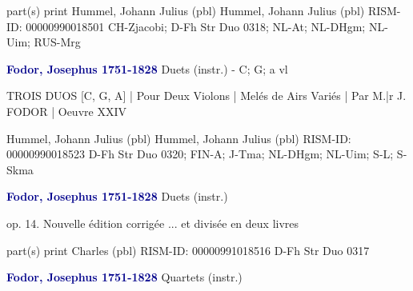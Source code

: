 \documentclass[twocolumn]{book}
\begin{document}
\newline \textcolor{darkblue}{}  part(s)
\newline print
\newline Hummel, Johann Julius  (pbl)
\newline Hummel, Johann Julius  (pbl)
\newline RISM-ID: 00000990018501
\newline CH-Zjacobi; D-Fh  Str Duo 0318; NL-At; NL-DHgm; NL-Uim; RUS-Mrg
\newline \par \vspace{7pt} \textcolor{darkblue}{\textbf{Fodor, Josephus  1751-1828}}
\newline Duets (instr.) - C; G; a
 vl
\newline \begin{itshape}TROIS DUOS [C, G, A] | Pour Deux Violons | Melés de Airs Variés | Par  M.|r J. FODOR | Oeuvre XXIV\end{itshape} 
\newline Hummel, Johann Julius  (pbl)
\newline Hummel, Johann Julius  (pbl)
\newline RISM-ID: 00000990018523
\newline D-Fh  Str Duo 0320; FIN-A; J-Tma; NL-DHgm; NL-Uim; S-L; S-Skma
\newline \par \vspace{7pt} \textcolor{darkblue}{\textbf{Fodor, Josephus  1751-1828}}
\newline Duets (instr.)
\newline \begin{itshape}op. 14. Nouvelle édition corrigée ... et divisée en deux livres\end{itshape} 
\newline \textcolor{darkblue}{}  part(s)
\newline print
\newline Charles  (pbl)
\newline RISM-ID: 00000991018516
\newline D-Fh  Str Duo 0317
\newline \par \vspace{7pt} \textcolor{darkblue}{\textbf{Fodor, Josephus  1751-1828}}
\newline Quartets (instr.)
\end{document}
